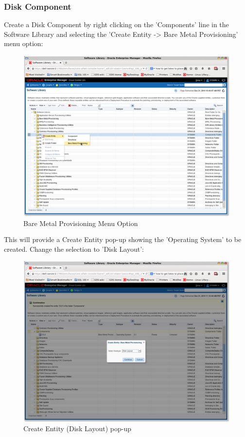 \documentclass[11pt]{article}
\begin{document}
\subsubsection{Disk Component}
\label{sec-4-3-2}
Create a Disk Component by right clicking on the 'Components' line in the Software Library and selecting the 'Create Entity -> Bare Metal Provisioning' menu option:
\begin{figure}[htb]
\centering
\includegraphics[width=.9\linewidth]{./images/Software_Library_BMP_Menu.png}
\caption{Bare Metal Provisioning Menu Option}
\end{figure}
\clearpage

This will provide a Create Entity pop-up showing the 'Operating System' to be created. Change the selection to 'Disk Layout':
\begin{figure}[htb]
\centering
\includegraphics[width=.9\linewidth]{./images/Create_Entity_BMP_DL.png}
\caption{Create Entity (Disk Layout) pop-up}
\end{figure}
\clearpage
\end{document}
